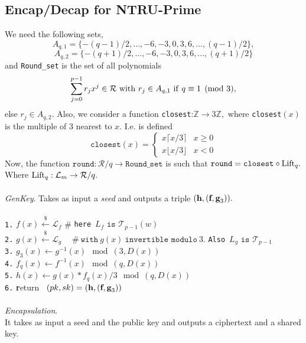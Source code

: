 \documentclass{amsart}
\numberwithin{equation}{section}
\begin{document}
 \subsection{Encap/Decap for NTRU-Prime} We need the following sets,
 $$A_{q,1}=\{-(q-1)/2,...,-6,-3,0,3,6,...,(q-1)/2\},$$ 
 $$A_{q,2}=\{-(q+1)/2,...,-6,-3,0,3,6,...,(q+1)/2\}$$ and
  {\texttt{Round\_set}} is the set of all polynomials 
 $$\sum_{j=0}^{p-1} r_jx^j\in {\mathcal{R}}\ {\rm{with}}\ r_j\in A_{q,1}\ {\rm{if}}\ q\equiv 1 \pmod{3},$$ else $r_j\in A_{q,2}.$
 Also, we consider a function {\texttt{closest}}:${\mathbb{Z}}\rightarrow 3{\mathbb{Z}},$ where {\texttt{closest}}$(x)$ is the  multiple of $3$ nearest to $x.$ I.e. is defined  
\[ {\texttt{closest}}(x) = \begin{cases} 
      x\lceil x/3 \rceil & x\geq 0 \\
      x\lfloor x/3 \rfloor & x <0 
   \end{cases}
\] 
 Now, the function ${\texttt{round}}:{\mathcal{R}}/q\rightarrow {\texttt{Round\_set}}$ is such that ${\texttt{round}} = {\texttt{closest}}\circ {\rm{Lift}}_q.$
Where ${\rm{Lift}}_q:{\mathcal{L}}_m\rightarrow {\mathcal{R}}/q.$
\ \\\\
{\it GenKey}. 
Takes as input a {\it{seed}} and outputs a triple $({\textbf h},({\textbf f},{\textbf g}_3)).$\\\\
\texttt{1.}  $f(x)\xleftarrow{\$} {\mathcal{L}}_f $  \hspace{10pt} \# {\texttt{here}}\ $L_f \texttt{ is } {\mathcal{T}}_{p-1}(w)$\\
\texttt{2.}  $g(x)\xleftarrow{\$} {\mathcal{L}}_g\hspace{10pt}\ \ \# \ {\texttt{with}}\ g(x)\  \texttt{invertible modulo}\ 3.$  {\texttt{Also}}\ $L_g \texttt{ is } {\mathcal{T}}_{p-1}$\\
\texttt{3.}  $g_3(x)\leftarrow g^{-1}(x)\mod{(3,D(x))}$\\
\texttt{4.} $f_q(x)\leftarrow f^{-1}(x)\mod{(q,D(x))}$\\
\texttt{5.}  $h(x) \leftarrow g(x)*f_q(x)/3\mod{(q,D(x))}$\\ 
\texttt{6.} {\textbf return} \ $(pk,sk)=({\textbf h},({\textbf f},{\textbf g}_3))$\ \\\\
{\it Encapsulation}.
\ \\
It takes as input a seed and the public key and outputs a ciphertext and a shared key.\\\\
\end{document}
